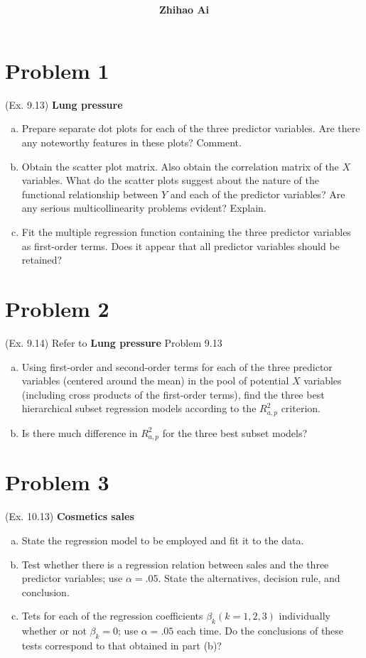 \documentclass[10pt]{report}
\title{
	\vspace{2in}
	\textmd{\textbf{\hwCourse\\\hwTitle}}\\
	\vspace{0.3in}\large{\textit{\hmClassInstructor}}
	\vspace{3in}
}
\author{\textbf{Zhihao Ai}}
\date{}
\begin{document}
\maketitle

\section*{Problem 1}
(Ex. 9.13) \textbf{Lung pressure}
\begin{enumerate}[a.]
	\item 
	Prepare separate dot plots for each of the three predictor variables. Are there any noteworthy features in these plots? Comment.
	
	\item 
	Obtain the scatter plot matrix. Also obtain the correlation matrix of the $X$ variables. What do the scatter plots suggest about the nature of the functional relationship between $Y$ and each of the predictor variables? Are any serious multicollinearity problems evident? Explain.
	
	\item 
	Fit the multiple regression function containing the three predictor variables as first-order terms. Does it appear that all predictor variables should be retained?
\end{enumerate}

\section*{Problem 2}
(Ex. 9.14) Refer to \textbf{Lung pressure} Problem 9.13
\begin{enumerate}[a.]
	\item 
	Using first-order and second-order terms for each of the three predictor variables (centered around the mean) in the pool of potential $X$ variables (including cross products of the first-order terms), find the three best hierarchical subset regression models according to the $R_{a,p}^2$ criterion.
	
	\item 
	Is there much difference in $R_{a,p}^2$ for the three best subset models?
\end{enumerate}

\section*{Problem 3}
(Ex. 10.13) \textbf{Cosmetics sales}
\begin{enumerate}[a.]
	\item 
	State the regression model to be employed and fit it to the data.
	
	\item 
	Test whether there is a regression relation between sales and the three predictor variables; use $\alpha = .05$. State the alternatives, decision rule, and conclusion.
	
	\item 
	Tets for each of the regression coefficients $\beta_k (k=1,2,3)$ individually whether or not $\beta_k=0$; use $\alpha = .05$ each time. Do the conclusions of these tests correspond to that obtained in part (b)?
\end{enumerate}
\end{document}
